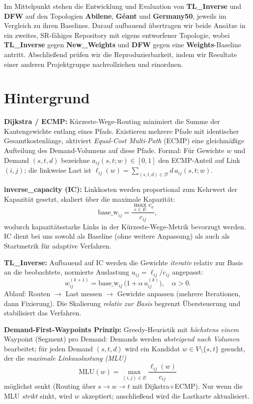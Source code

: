\documentclass[sigconf,nonacm,review]{acmart}
\begin{document}
Im Mittelpunkt stehen die Entwicklung und Evaluation von \textbf{TL\_Inverse} und \textbf{DFW} auf den Topologien \textbf{Abilene}, \textbf{Géant} und \textbf{Germany50}, jeweils im Vergleich zu ihren Baselines. Darauf aufbauend übertragen wir beide Ansätze in ein zweites, SR-fähiges Repository mit eigens entworfener Topologie, wobei \textbf{TL\_Inverse} gegen \textbf{New\_Weights} und \textbf{DFW} gegen eine \textbf{Weights}-Baseline antritt. Abschließend prüfen wir die Reproduzierbarkeit, indem wir Resultate einer anderen Projektgruppe nachvollziehen und einordnen.



\section{Hintergrund}

\textbf{Dijkstra / ECMP:}
Kürzeste-Wege-Routing minimiert die Summe der Kantengewichte entlang eines Pfads.
Existieren mehrere Pfade mit identischer Gesamtkostenlänge, aktiviert \emph{Equal-Cost Multi-Path} (ECMP)
eine gleichmäßige Aufteilung des Demand-Volumens auf diese Pfade. Formal: Für Gewichte $w$ und Demand $(s,t,d)$
bezeichne $a_{ij}(s,t;w)\in[0,1]$ den ECMP-Anteil auf Link $(i,j)$; die linkweise Last ist
$\ell_{ij}(w)=\sum_{(s,t,d)\in\mathcal D} d\,a_{ij}(s,t;w)$.

\textbf{inverse\_capacity (IC):}
Linkkosten werden proportional zum Kehrwert der Kapazität gesetzt, skaliert über die maximale Kapazität:
\[
\mathrm{base\_w}_{ij}=\frac{\max_{e\in E}c_e}{c_{ij}}\!,
\]
wodurch kapazitätsstarke Links in der Kürzeste-Wege-Metrik bevorzugt werden. IC dient bei uns sowohl als Baseline
(ohne weitere Anpassung) als auch als Startmetrik für adaptive Verfahren.

\textbf{TL\_Inverse:}
Aufbauend auf IC werden die Gewichte \emph{iterativ} relativ zur Basis an die beobachtete, normierte Auslastung
$u_{ij}=\ell_{ij}/c_{ij}$ angepasst:
\[
w^{(k+1)}_{ij}=\mathrm{base\_w}_{ij}\,\bigl(1+\alpha\,u^{(k)}_{ij}\bigr),\quad \alpha>0.
\]
Ablauf: Routen $\rightarrow$ Last messen $\rightarrow$ Gewichte anpassen (mehrere Iterationen, dann Fixierung).
Die Skalierung \emph{relativ zur Basis} begrenzt Übersteuerung und stabilisiert das Verfahren.

\textbf{Demand-First-Waypoints Prinzip:}
Greedy-Heuristik mit \emph{höchstens einem} Waypoint (Segment) pro Demand: Demands werden \emph{absteigend nach Volumen}
bearbeitet; für jeden Demand $(s,t,d)$ wird ein Kandidat $w\in V\setminus\{s,t\}$ gesucht, der die
\emph{maximale Linkauslastung (MLU)} 
\[
\mathrm{MLU}(w)=\max_{(i,j)\in E}\frac{\ell_{ij}(w)}{c_{ij}}
\]
möglichst senkt (Routing über $s\!\to\!w\!\to\!t$ mit Dijkstra+ECMP). Nur wenn die MLU \emph{strikt} sinkt, wird $w$ akzeptiert;
anschließend wird die Lastkarte aktualisiert.
\end{document}
